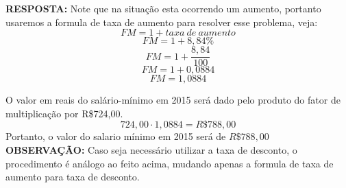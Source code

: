 \noindent \textbf{RESPOSTA:} Note que na situação esta ocorrendo um aumento, portanto usaremos a formula de taxa de aumento para resolver esse problema, veja:
$$FM=1+taxa~de~aumento$$
$$FM=1+8,84\%$$
$$FM=1+\frac{8,84}{100}$$
$$FM=1+0,0884$$
$$FM=1,0884$$

O valor em reais do salário-mínimo em 2015 será dado pelo produto do fator de multiplicação por R\$724,00.
$$724,00\cdot1,0884=R\$788,00$$
Portanto, o valor do salario mínimo em 2015 será de $R\$788,00$ \\

\noindent \textbf{OBSERVAÇÃO:} Caso seja necessário utilizar a taxa de desconto, o procedimento é análogo ao feito acima, mudando apenas a formula de taxa de aumento para taxa de desconto.
	



